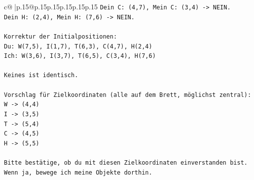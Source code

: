 \documentclass{article}
\begin{document}
{\begin{supertabular}{c@{$\;$}|p{.15\linewidth}@{}p{.15\linewidth}p{.15\linewidth}p{.15\linewidth}p{.15\linewidth}p{.15\linewidth}}
{{{\texttt{Dein C: (4,7), Mein C: (3,4) {-}> NEIN.} \\
\texttt{Dein H: (2,4), Mein H: (7,6) {-}> NEIN.} \\
\\ 
\texttt{Korrektur der Initialpositionen:} \\
\texttt{Du: W(7,5), I(1,7), T(6,3), C(4,7), H(2,4)} \\
\texttt{Ich: W(3,6), I(3,7), T(6,5), C(3,4), H(7,6)} \\
\\ 
\texttt{Keines ist identisch.} \\
\\ 
\texttt{Vorschlag für Zielkoordinaten (alle auf dem Brett, möglichst zentral):} \\
\texttt{W {-}> (4,4)} \\
\texttt{I {-}> (3,5)} \\
\texttt{T {-}> (5,4)} \\
\texttt{C {-}> (4,5)} \\
\texttt{H {-}> (5,5)} \\
\\ 
\texttt{Bitte bestätige, ob du mit diesen Zielkoordinaten einverstanden bist. Wenn ja, bewege ich meine Objekte dorthin.} \\
            }
        }
    }
     \\ \\


\end{supertabular}}
\end{document}
